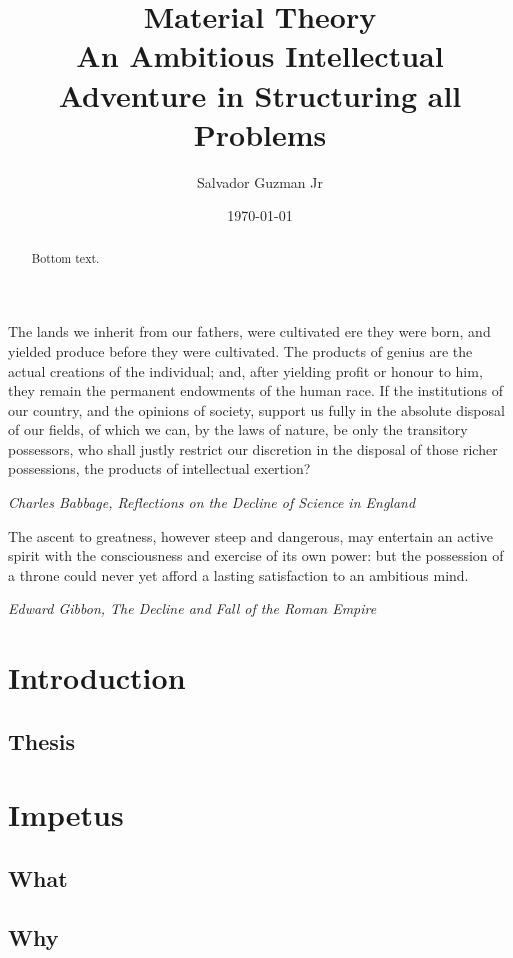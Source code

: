 \documentclass[UTF8]{article}
\title{%
	Material Theory\\
	\large An Ambitious Intellectual Adventure in Structuring all Problems
}
\author{Salvador Guzman Jr}
\date{\today}
\begin{document}
	\maketitle
	\newpage

	\begin{abstract}
		Bottom text.
	\end{abstract}

	\newpage

	\begin{center}
		\epigraph{
			The lands we inherit from our fathers, were cultivated ere they were born, and yielded produce before they were cultivated. The products of genius are the actual creations of the individual; and, after yielding profit or honour to him, they remain the permanent endowments of the human race. If the institutions of our country, and the opinions of society, support us fully in the absolute disposal of our fields, of which we can, by the laws of nature, be only the transitory possessors, who shall justly restrict our discretion in the disposal of those richer possessions, the products of intellectual exertion?
		}{\textit{Charles Babbage, Reflections on the Decline of Science in England}}
		\epigraph{
			The ascent to greatness, however steep and dangerous, may entertain an active spirit with the consciousness and exercise of its own power: but the possession of a throne could never yet afford a lasting satisfaction to an ambitious mind.
		}{\textit{Edward Gibbon, The Decline and Fall of the Roman Empire}}
	\end{center}

	\newpage
	\tableofcontents
	\newpage
	
	\section{Introduction}
	\subsection{Thesis}

	\section{Impetus}
	\subsection{What}
	\subsection{Why}
\end{document}
